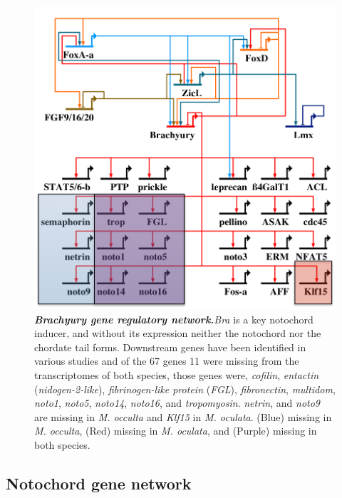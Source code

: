 \begin{figure}[tbp]
\centering
\includegraphics[scale=0.55]{figures/bra_grn.pdf}
\caption{\textbf{\textit{Brachyury gene regulatory network.}}\textit{Bra} is a key notochord inducer, and without its expression neither the notochord nor the chordate tail forms. Downstream genes have been identified in various studies and of the 67 genes 11 were missing from the transcriptomes of both species, those genes were, \textit{cofilin}, \textit{entactin} (\textit{nidogen-2-like}), \textit{fibrinogen-like protein} (\textit{FGL}), \textit{fibronectin}, \textit{multidom}, \textit{noto1}, \textit{noto5}, \textit{noto14}, \textit{noto16}, and \textit{tropomyosin}. \textit{netrin}, and \textit{noto9} are missing in \textit{M. occulta} and \textit{Klf15} in \textit{M. oculata}. (Blue) missing in \textit{M. occulta}, (Red) missing in \textit{M. oculata}, and (Purple) missing in both species.}
\label{fig:bra_grn}
\end{figure}
\subsection{Notochord gene network}

